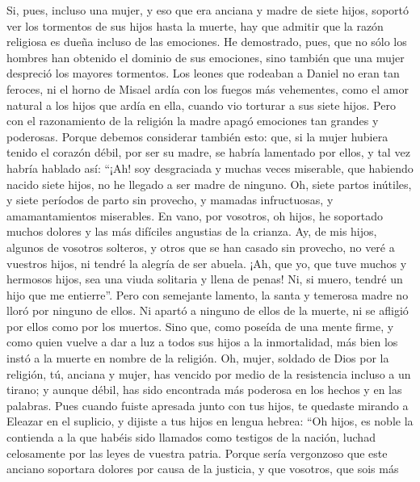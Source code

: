  Si, pues, incluso una mujer, y eso que era anciana y
madre de siete hijos, soportó ver los tormentos de sus hijos hasta la
muerte, hay que admitir que la razón religiosa es dueña incluso de las
emociones.  He demostrado, pues, que no sólo los hombres
han obtenido el dominio de sus emociones, sino también que una mujer
despreció los mayores tormentos.  Los leones que rodeaban
a Daniel no eran tan feroces, ni el horno de Misael ardía con los fuegos
más vehementes, como el amor natural a los hijos que ardía en ella,
cuando vio torturar a sus siete hijos.  Pero con el
razonamiento de la religión la madre apagó emociones tan grandes y
poderosas.  Porque debemos considerar también esto: que,
si la mujer hubiera tenido el corazón débil, por ser su madre, se habría
lamentado por ellos, y tal vez habría hablado así:  ``¡Ah!
soy desgraciada y muchas veces miserable, que habiendo nacido siete
hijos, no he llegado a ser madre de ninguno.  Oh, siete
partos inútiles, y siete períodos de parto sin provecho, y mamadas
infructuosas, y amamantamientos miserables.  En vano, por
vosotros, oh hijos, he soportado muchos dolores y las más difíciles
angustias de la crianza.  Ay, de mis hijos, algunos de
vosotros solteros, y otros que se han casado sin provecho, no veré a
vuestros hijos, ni tendré la alegría de ser abuela.  ¡Ah,
que yo, que tuve muchos y hermosos hijos, sea una viuda solitaria y
llena de penas!  Ni, si muero, tendré un hijo que me
entierre''. Pero con semejante lamento, la santa y temerosa madre no
lloró por ninguno de ellos.  Ni apartó a ninguno de ellos
de la muerte, ni se afligió por ellos como por los muertos.
 Sino que, como poseída de una mente firme, y como quien
vuelve a dar a luz a todos sus hijos a la inmortalidad, más bien los
instó a la muerte en nombre de la religión.  Oh, mujer,
soldado de Dios por la religión, tú, anciana y mujer, has vencido por
medio de la resistencia incluso a un tirano; y aunque débil, has sido
encontrada más poderosa en los hechos y en las palabras. 
Pues cuando fuiste apresada junto con tus hijos, te quedaste mirando a
Eleazar en el suplicio, y dijiste a tus hijos en lengua hebrea:
 ``Oh hijos, es noble la contienda a la que habéis sido
llamados como testigos de la nación, luchad celosamente por las leyes de
vuestra patria.  Porque sería vergonzoso que este anciano
soportara dolores por causa de la justicia, y que vosotros, que sois más
